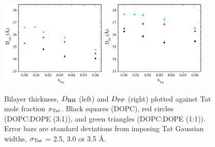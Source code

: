 \begin{figure}[htbp]
  \centering
  \includegraphics[width=0.45\textwidth]{figures/Tat/SDP_Results/DHH}
  \qquad
  \includegraphics[width=0.45\textwidth]{figures/Tat/SDP_Results/DPP}
  \caption{Bilayer thickness, $D_\textrm{HH}$ (left) and $D_\textrm{PP}$ (right)
  plotted against Tat mole fraction $x_\textrm{Tat}$.
  Black squares (DOPC), red circles (DOPC:DOPE (3:1)), and green
  triangles (DOPC:DOPE (1:1)).
  Error bars are standard deviations from imposing Tat Gaussian widths, 
  $\sigma_\textrm{Tat}$ = 2.5, 3.0 or 3.5 \AA.}
  \label{fig:DHH_DPP}
\end{figure}

